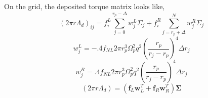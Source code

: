 \documentclass{article}
\begin{document}
On the grid, the deposited torque matrix looks like,
\begin{equation}
(2 \pi r \Lambda_d)_{ij} = f_i^L \sum_{j=0}^{r_p-\Delta } w_j^L \Sigma_j + f_i^R \sum_{j=r_p+\Delta}^N w_j^R \Sigma_j
\end{equation}
\begin{equation}
w_j^L = -.4 f_{NL} 2 \pi r_p^3 \Omega_p^2 q^2  \left( \frac{r_p}{r_j - r_p} \right)^4 \Delta r_j
\end{equation}
\begin{equation}
w_j^R=  .4 f_{NL} 2 \pi r_p^3 \Omega_p^2 q^2  \left( \frac{r_p}{r_j - r_p} \right)^4 \Delta r_j
\end{equation}
\begin{equation}
(2 \pi r \Lambda_d) = (\mathbf{f}_L \mathbf{w}_L^T + \mathbf{f}_R \mathbf{w}_R^T ) \mathbf{\Sigma}
\end{equation}
\end{document}
